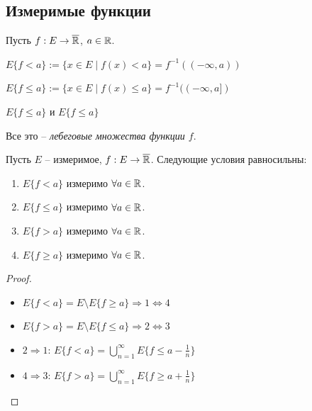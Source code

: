 \subsection{Измеримые функции}

\begin{definition}
    Пусть $f: E\rightarrow \overline{\mathbb{R}}$, $a\in \mathbb{R}$.

    $E\{f<a\}:= \{x\in E\mid f(x) < a\}=f^{-1}((-\infty, a))$

    $E\{f\leq a\}:= \{x\in E\mid f(x) \leq a\}=f^{-1}((-\infty, a])$

    $E\{f\leq a\}$ и $E\{f\leq a\}$ 

    Все это – \textit{лебеговые множества функции $f$}.
\end{definition}

\begin{theorem}
    Пусть $E$ – измеримое, $f:E\rightarrow \overline{\mathbb{R}}$. Следующие условия 
    равносильны:

    \begin{enumerate}
        \item $E\{f<a\}$ измеримо $\forall a\in \mathbb{R}$.
        
        \item $E\{f\leq a\}$ измеримо $\forall a\in \mathbb{R}$.
        
        \item $E\{f>a\}$ измеримо $\forall a\in \mathbb{R}$.
        
        \item $E\{f\geq a\}$ измеримо $\forall a\in \mathbb{R}$.
    \end{enumerate}
\end{theorem}

\begin{proof}~

    \begin{itemize}
        \item $E\{f<a\} = E\setminus E\{f\geq a\}\Rightarrow 1\Leftrightarrow 4$
        
        \item $E\{f>a\} = E\setminus E\{f\leq a\}\Rightarrow 2\Leftrightarrow 3$
        
        \item $2\Rightarrow 1$: $E\{f<a\} =\bigcup\limits_{n=1}^\infty E\{f\leq a-\frac{1}{n}\}$
        
        \item $4\Rightarrow 3$: $E\{f>a\} =\bigcup\limits_{n=1}^\infty E\{f\geq a+\frac{1}{n}\}$
    \end{itemize}
\end{proof}

